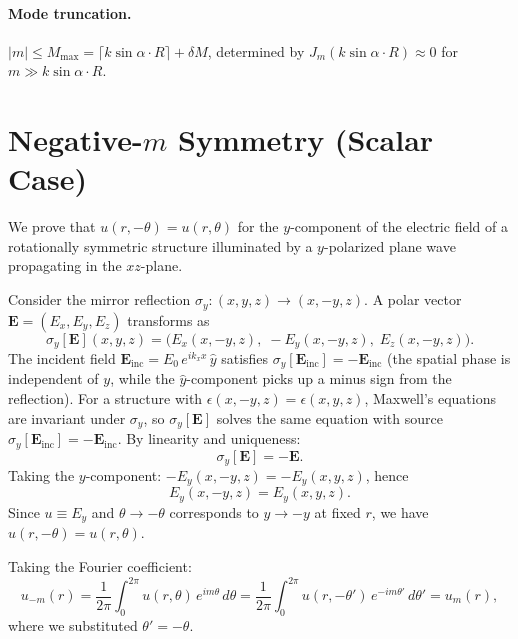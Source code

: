 \documentclass[11pt,a4paper]{article}
\newcommand{\yhat}{\hat{y}}
\newcommand{\E}{\mathbf{E}}
\begin{document}
\paragraph{Mode truncation.}
$|m| \le M_{\max} = \lceil k\sin\alpha\cdot R\rceil + \delta M$,
determined by $J_m(k\sin\alpha\cdot R) \approx 0$ for $m \gg k\sin\alpha\cdot R$.


\section{Negative-$m$ Symmetry (Scalar Case)}
\label{sec:scalar_symmetry}

We prove that $u(r,-\theta) = u(r,\theta)$ for the $y$-component of the electric
field of a rotationally symmetric structure illuminated by a $y$-polarized plane
wave propagating in the $xz$-plane.

Consider the mirror reflection $\sigma_y: (x,y,z) \to (x,-y,z)$.  A polar vector
$\E = (E_x,E_y,E_z)$ transforms as
\begin{equation}
  \sigma_y[\E](x,y,z)
  = \bigl(E_x(x,-y,z),\;-E_y(x,-y,z),\;E_z(x,-y,z)\bigr).
\end{equation}
The incident field $\E_{\mathrm{inc}} = E_0\,e^{ik_x x}\,\yhat$ satisfies
$\sigma_y[\E_{\mathrm{inc}}] = -\E_{\mathrm{inc}}$ (the spatial phase is independent
of $y$, while the $\yhat$-component picks up a minus sign from the reflection).
For a structure with $\epsilon(x,-y,z) = \epsilon(x,y,z)$, Maxwell's equations
are invariant under $\sigma_y$, so $\sigma_y[\E]$ solves the same equation with
source $\sigma_y[\E_{\mathrm{inc}}] = -\E_{\mathrm{inc}}$.  By linearity and
uniqueness:
\begin{equation}
  \sigma_y[\E] = -\E.
\end{equation}
Taking the $y$-component: $-E_y(x,-y,z) = -E_y(x,y,z)$, hence
\begin{equation}
  E_y(x,-y,z) = E_y(x,y,z).
\end{equation}
Since $u \equiv E_y$ and $\theta \to -\theta$ corresponds to $y \to -y$ at fixed $r$,
we have $u(r,-\theta) = u(r,\theta)$.

Taking the Fourier coefficient:
\begin{equation}
  u_{-m}(r) = \frac{1}{2\pi}\int_0^{2\pi} u(r,\theta)\,e^{im\theta}\,d\theta
  = \frac{1}{2\pi}\int_0^{2\pi} u(r,-\theta')\,e^{-im\theta'}\,d\theta'
  = u_m(r),
\end{equation}
where we substituted $\theta' = -\theta$.
\end{document}
